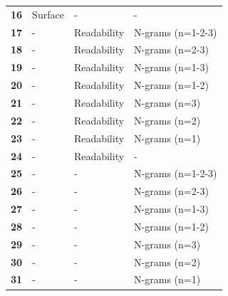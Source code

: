 \documentclass[
10pt, %
a4paper, %
oneside, %
headinclude,footinclude, %
] {book}%
\begin{document}
\begin{table}[]
\begin{tabular}{llll}
\textbf{16} & Surface        & -              & -                 \\
\textbf{17} & -              & Readability    & N-grams (n=1-2-3) \\
\textbf{18} & -              & Readability    & N-grams (n=2-3)   \\
\textbf{19} & -              & Readability    & N-grams (n=1-3)   \\
\textbf{20} & -              & Readability    & N-grams (n=1-2)   \\
\textbf{21} & -              & Readability    & N-grams (n=3)     \\
\textbf{22} & -              & Readability    & N-grams (n=2)     \\
\textbf{23} & -              & Readability    & N-grams (n=1)     \\
\textbf{24} & -              & Readability    & -                 \\
\textbf{25} & -              & -              & N-grams (n=1-2-3) \\
\textbf{26} & -              & -                & N-grams (n=2-3)   \\
\textbf{27} & -              & -               & N-grams (n=1-3)   \\
\textbf{28} & -              & -               & N-grams (n=1-2)   \\
\textbf{29} & -              & -              & N-grams (n=3)     \\
\textbf{30} & -              & -                & N-grams (n=2)     \\
\textbf{31} & -              & -                & N-grams (n=1)    
\end{tabular}
\label{evaluation-combinations}
\end{table}
\end{document}
